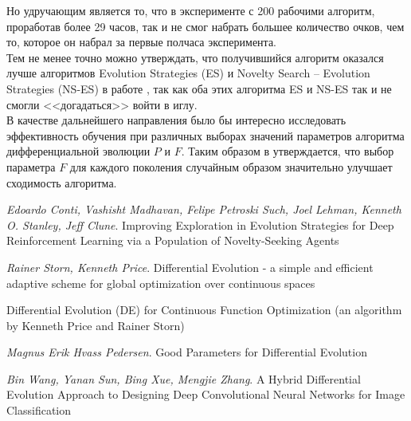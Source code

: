 \documentclass[12pt]{article}
\begin{document}
    Но удручающим является то, что в эксперименте с 200 рабочими алгоритм, проработав более 29 часов, так и не смог набрать большее количество очков, чем то, которое он набрал за первые полчаса эксперимента. \\

    Тем не менее точно можно утверждать, что получившийся алгоритм оказался лучше алгоритмов Evolution Strategies (ES) и Novelty Search -- Evolution Strategies (NS-ES) в работе \cite{uber}, так как оба этих алгоритма ES и NS-ES так и не смогли <<догадаться>> войти в иглу. \\

    В качестве дальнейшего направления было бы интересно исследовать эффективность обучения при различных выборах значений параметров алгоритма дифференциальной эволюции $P$ и $F$. Таким образом в \cite{DE} утверждается, что выбор параметра $F$ для каждого поколения случайным образом значительно улучшает сходимость алгоритма.

\newpage
{}
\begin{thebibliography}{}
    \emph{Edoardo Conti, Vashisht Madhavan, Felipe Petroski Such, Joel Lehman, Kenneth O. Stanley, Jeff Clune}.
    Improving Exploration in Evolution Strategies for Deep Reinforcement Learning via a Population of Novelty-Seeking Agents
    
    \emph{Rainer Storn, Kenneth Price}. Differential Evolution - a simple and efficient adaptive scheme for global optimization over continuous spaces

    Differential Evolution (DE) for Continuous Function Optimization (an algorithm by Kenneth Price and Rainer Storn)

    \emph{Magnus Erik Hvass Pedersen}. Good Parameters for Differential Evolution

    \emph{Bin Wang, Yanan Sun, Bing Xue, Mengjie Zhang}. A Hybrid Differential Evolution Approach to Designing Deep Convolutional Neural Networks for Image Classification \\

\end{thebibliography}
\end{document}
